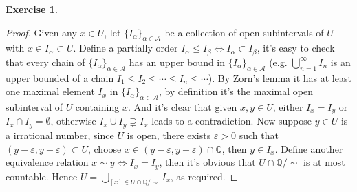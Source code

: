 \documentclass[a4paper]{article}
\newtheorem{ex}{Exercise}[subsection]
\begin{document}
\setcounter{ex}{9}\begin{ex}\end{ex}\begin{proof}
Given any $x \in U$, let $\{I_\alpha\}_{\alpha \in \mathcal{A}}$ be a collection of open subintervals of $U$ with 
$x \in I_\alpha \subset U$. Define a partially order $I_\alpha \leq I_\beta \Leftrightarrow I_\alpha \subset I_\beta$,
it's easy to check that every chain of $\{I_\alpha\}_{\alpha \in \mathcal{A}}$ has an upper bound in $\{I_\alpha\}_{\alpha \in \mathcal{A}}$
(e.g. $\bigcup_{n = 1}^\infty I_n$ is an upper bounded of a chain $I_1 \leq I_2 \leq \cdots \leq I_n \leq \cdots$).
By Zorn's lemma it has at least one maximal element $I_x$ in $\{I_\alpha\}_{\alpha \in \mathcal{A}}$, by definition it's
the maximal open subinterval of $U$ containing $x$. And it's clear that given $x, y \in U$, either $I_x = I_y$ or 
$I_x \cap I_y =  \emptyset$, otherwise $I_x \cup I_y \supsetneq I_x$ leads to a contradiction. Now suppose $y \in U$ is 
a irrational number, since $U$ is open, there exists $\varepsilon > 0$ such that $(y - \varepsilon, y + \varepsilon) \subset U$,
choose $x \in (y - \varepsilon, y + \varepsilon) \cap \mathbb{Q}$, then $y \in I_x$. Define another equivalence relation
$x \sim y \Leftrightarrow I_x = I_y$, then it's obvious that $U \cap \mathbb{Q} / \sim$ is at most countable. Hence 
$U = \bigcup_{[x] \in U \cap \mathbb{Q} / \sim} I_x$, as required.
\end{proof}
\end{document}
